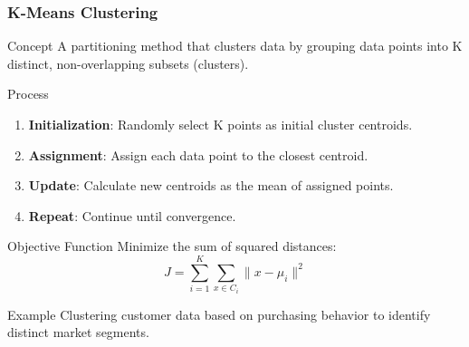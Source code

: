 \documentclass[aspectratio=169]{beamer}
\begin{document}
\begin{frame}[fragile]
    \frametitle{K-Means Clustering}
    \begin{block}{Concept}
        A partitioning method that clusters data by grouping data points into K distinct, non-overlapping subsets (clusters).
    \end{block}
    \begin{block}{Process}
        \begin{enumerate}
            \item \textbf{Initialization}: Randomly select K points as initial cluster centroids.
            \item \textbf{Assignment}: Assign each data point to the closest centroid.
            \item \textbf{Update}: Calculate new centroids as the mean of assigned points.
            \item \textbf{Repeat}: Continue until convergence.
        \end{enumerate}
    \end{block}
    \begin{block}{Objective Function}
        Minimize the sum of squared distances:
        \begin{equation}
        J = \sum_{i=1}^{K} \sum_{x \in C_i} \| x - \mu_i \|^2 
        \end{equation}
    \end{block}
    \begin{block}{Example}
        Clustering customer data based on purchasing behavior to identify distinct market segments.
    \end{block}
\end{frame}
\end{document}
